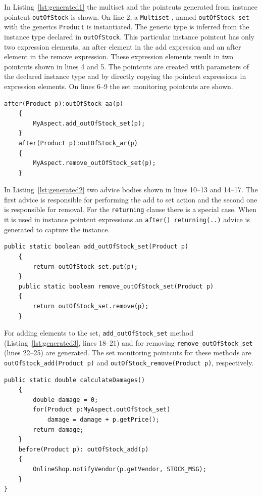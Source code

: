 \documentclass{llncs}
\begin{document}
In Listing~\ref{lst:generated1} the multiset and the pointcuts generated from instance pointcut \texttt{outOfStock} is shown. On line 2, a \texttt{Multiset} \cite{bourrillionguava}, named \texttt{outOfStock_set} with the generics \texttt{Product} is instantiated. The generic type is inferred from the instance type declared in \texttt{outOfStock}. This particular instance pointcut has only two expression elements, an after element in the add expression and an after element in the remove expression. These expression elements result in two pointcuts shown in lines 4 and 5. The pointcuts are created with parameters of the declared instance type and by directly copying the pointcut expressions in expression elements. On lines 6--9 the set monitoring pointcuts are shown.

\begin{lstlisting}[float=h!,firstnumber = {10}, caption={The generated AspectJ advices from \texttt{outOfStock} instance pointcut}, label={lst:generated2}]	
	after(Product p):outOfStock_aa(p)
	{
		MyAspect.add_outOfStock_set(p);
	}
	after(Product p):outOfStock_ar(p)
	{
		MyAspect.remove_outOfStock_set(p);
	}
\end{lstlisting}	

In Listing~\ref{lst:generated2} two advice bodies shown in lines 10--13 and 14--17. The first advice is responsible for performing the add to set action and the second one is responsible for removal. For the \texttt{returning} clause there is a special case. When it is used in instance pointcut expressions an \texttt{after() returning(..)} advice is generated to capture the instance. 

\begin{lstlisting}[float=h!, firstnumber = {18},caption={The set add/remove methods for \texttt{outOfStock} instance pointcut}, label={lst:generated3}]		
	public static boolean add_outOfStock_set(Product p)
	{
		return outOfStock_set.put(p);
	}
	public static boolean remove_outOfStock_set(Product p)
	{
		return outOfStock_set.remove(p);
	}
\end{lstlisting}


For adding elements to the set, \texttt{add_outOfStock_set} method (Listing~\ref{lst:generated3}, lines 18--21) and for removing \texttt{remove_outOfStock_set} (lines 22--25) are generated. The set monitoring pointcuts for these methods are \texttt{outOfStock_add(Product p)} and \texttt{outOfStock_remove(Product p)}, respectively. 


\begin{lstlisting}[float=h!, firstnumber = {26},caption={The examples from Listing~\ref{lst:setaccess} and Listing~\ref{lst:monitor1}}, label={lst:generated4}]	
	public static double calculateDamages()
	{
		double damage = 0;
		for(Product p:MyAspect.outOfStock_set)
			damage = damage + p.getPrice();
		return damage;
	}
	before(Product p): outOfStock_add(p)
	{
		OnlineShop.notifyVendor(p.getVendor, STOCK_MSG);
	}
}
\end{lstlisting}
\end{document}
